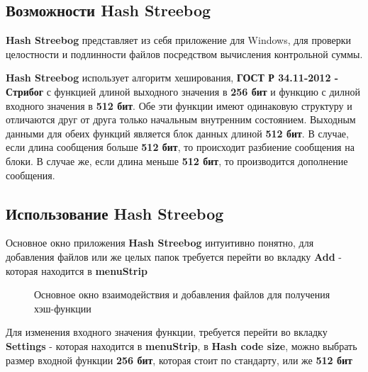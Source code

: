 \documentclass[a4paper,14pt]{report}
\begin{document}
\subsection{Возможности Hash Streebog}

\textbf{Hash Streebog} представляет из себя приложение для Windows,  для проверки целостности и подлинности файлов посредством вычисления контрольной суммы.

\textbf{Hash Streebog} использует алгоритм хеширования, \textbf{ГОСТ Р 34.11-2012 - Стрибог} с функцией длиной выходного значения в \textbf{256 бит} и функцию с дилной входного значения в \textbf{512 бит}. Обе эти функции имеют одинаковую структуру и отличаются друг от друга только начальным внутренним состоянием. Выходным данными для обеих функций является блок данных длиной \textbf{512 бит}. В случае, если длина сообщения больше \textbf{512 бит}, то происходит разбиение сообщения на блоки. В случае же, если длина меньше \textbf{512 бит}, то производится дополнение сообщения. 

\subsection{Использование Hash Streebog}

Основное окно приложения \textbf{Hash Streebog} интуитивно понятно, для добавления файлов или же целых папок требуется перейти во вкладку \textbf{Add} - которая находится в \textbf{menuStrip}

\begin{figure}[h]
\caption{Основное окно взаимодействия и добавления файлов для получения хэш-функции}
\label{fig:image}
\end{figure}

Для изменения входного значения функции, требуется перейти во вкладку \textbf{Settings} - которая находится в \textbf{menuStrip}, в \textbf{Hash code size}, можно выбрать размер входной функции \textbf{256 бит}, которая стоит по стандарту, или же \textbf{512 бит}
\end{document}
